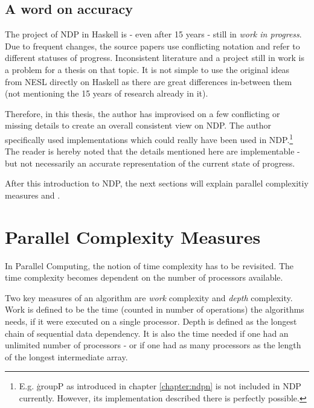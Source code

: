   \subsection*{A word on accuracy}
    The project of NDP in Haskell is - even after 15 years -
    still in \textit{work in progress}. Due to frequent changes,
    the source papers use conflicting notation and refer to
    different statuses of progress. Inconsistent literature and a project
    still in work is a problem for a thesis on that topic.
    It is not simple to use the original ideas from NESL directly
    on Haskell as there are great differences in-between them (not mentioning
    the 15 years of research already in it).
    
    Therefore, in this thesis, the author has improvised on a few conflicting or
    missing details to create an overall consistent view on NDP.
    The author specifically used implementations which could really have been
    used in NDP.\footnote{E.g. \c{groupP} as introduced in chapter \ref{chapter:ndpn}
    is not included in NDP currently. However, its implementation described there is perfectly possible.}
    The reader is hereby noted that the details
    mentioned here are implementable - but not necessarily an accurate
    representation of the current state of progress.
    
    After this introduction to NDP, the next sections will explain
    parallel complexitiy measures and \algo.
  
\section{Parallel Complexity Measures}
  \label{section:parmeasures}
  In Parallel Computing, the notion of time complexity
  has to be revisited. The time complexity becomes dependent on the
  number of processors available.
  
  Two key measures of an algorithm are \emph{work} complexity
  and \emph{depth} complexity. Work is defined
  to be the time (counted in number of operations)
  the algorithms needs, if it were executed on a single processor.
  Depth is defined as the longest chain of sequential data dependency.
  It is also the time needed if one had an unlimited number of processors -
  or if one had as many processors as the length of the longest intermediate array.
  
  
